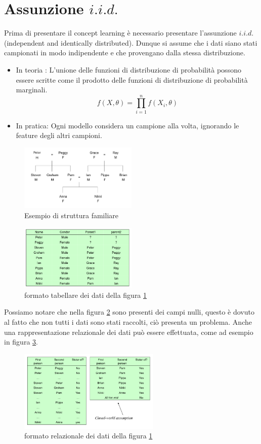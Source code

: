 \documentclass{../main.tex}[subfiles]
\begin{document}
\section{Assunzione $i.i.d.$}
Prima di presentare il concept learning è necessario presentare l'assunzione $i.i.d.$ (independent and identically distributed).
Dunque si assume che i dati siano stati campionati in modo indipendente e che provengano dalla stessa distribuzione.
\begin{itemize}
		\item 
		In teoria : L'unione delle funzioni di distribuzione di probabilità possono essere scritte come il prodotto delle funzioni di distribuzione di probabilità marginali.
		\[
		f(X,\theta)=\prod_{i=1}^n f(X_i,\theta)
		\]
	\item 
		In pratica: Ogni modello considera un campione alla volta, ignorando le feature degli altri campioni.
\end{itemize}
\begin{figure}[h]
	\centering
	\includegraphics[width=0.5\textwidth]{pictures/familyTree.png}
	\caption{Esempio di struttura familiare}
	\label{fig:iid}
\end{figure}
\begin{figure}
	\centering
	\includegraphics[width=0.5\textwidth]{pictures/familyTable.png}
	\caption{formato tabellare dei dati della figura \ref{fig:iid}}
	\label{fig:iid2}
\end{figure}
Possiamo notare che nella figura \ref{fig:iid2} sono presenti dei campi nulli, questo è dovuto al fatto che non tutti i dati sono stati raccolti, ciò presenta un problema.
Anche una rappresentazione relazionale dei dati può essere effettuata, come ad esempio in figura \ref{fig:iid3}.
\begin{figure}
	\centering
	\includegraphics[width=0.6\textwidth]{pictures/familyRel.png}
	\caption{formato relazionale dei dati della figura \ref{fig:iid}}
	\label{fig:iid3}
\end{figure}
\end{document}
